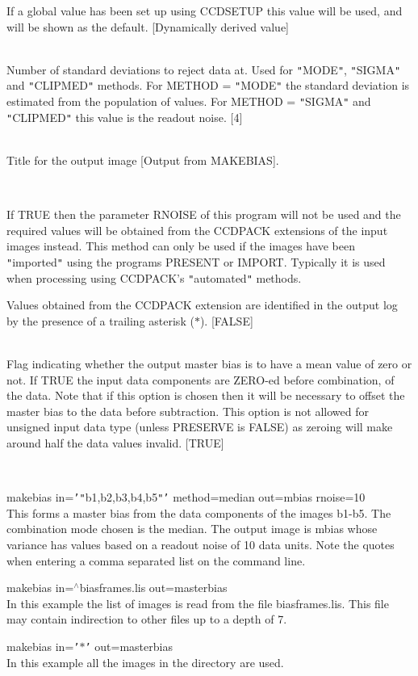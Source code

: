 \documentclass[twoside,11pt]{article}
\newcommand{\htmlref}[2]{#1}
\renewcommand{\_}{\texttt{\symbol{95}}}
\newcommand{\qt}[1]{{\tt "}#1{\tt "}}
\newcommand{\qs}[1]{{\tt '}#1{\tt '}}
\newcommand{\xroutine}[1]{\htmlref{{\sc #1}}{#1}}
\newcommand{\sstexamples}[1]{
   \item[Examples:] \mbox{} \\
   \vspace{-3.5ex}
   \begin{description}
      #1
   \end{description}
}
\newcommand{\sstsubsection}[1]{ \item[{#1}] \mbox{} \\}
\newcommand{\sstexamplesubsection}[2]{\sloppy \item{\ssttt #1} \mbox{} \\ #2 }
\newcommand{\sstnotes}[1]{\item[Notes:] \mbox{} \\[1.3ex] #1}
\newcommand{\sstitemlist}[1]{
  \mbox{} \\
  \vspace{-3.5ex}
  \begin{itemize}
     #1
  \end{itemize}
}
\newcommand{\sstexamples}[1]{
      \item[Examples:] \\
      \begin{description}
         #1
      \end{description}
      \\
   }
\newcommand{\sstsubsection}[1]{\item[{#1}]}
\newcommand{\sstexamplesubsection}[2]{\item[{\ssttt #1}] #2}
\newcommand{\sstnotes}[1]{\item[Notes:] #1 }
\newcommand{\sstitemlist}[1]{
      \begin{itemize}
         #1
      \end{itemize}
      \\
   }
\begin{document}
{{{         If a global value has been set up using \xroutine{CCDSETUP} this value
         will be used, and will be shown as the default.
         [Dynamically derived value]
      }
      \sstsubsection{
         SIGMAS = \_REAL (Read)
      } {
         Number of standard deviations to reject data at. Used for
         \qt{MODE}, \qt{SIGMA} and \qt{CLIPMED} methods. For METHOD =
         \qt{MODE} the standard deviation is estimated from the
         population of values. For METHOD = \qt{SIGMA} and
         \qt{CLIPMED} this value is the readout noise.
         [4]
      }
      \sstsubsection{
         TITLE = LITERAL (Read)
      } {
         Title for the output image
         [Output from MAKEBIAS].
      }
      \sstsubsection{
         USEEXT = \_LOGICAL (Read)
      } {
         If TRUE then the parameter RNOISE of this program will not
         be used and the required values will be obtained from the
         CCDPACK extensions of the input images instead. This method can
         only be used if the images have been \qt{imported} using the
         programs \xroutine{PRESENT} or \xroutine{IMPORT}. Typically it is used when
         processing using CCDPACK's \qt{automated} methods.

         Values obtained from the CCDPACK extension are identified in
         the output log by the presence of a trailing asterisk ($*$).
         [FALSE]
      }
      \sstsubsection{
         ZERO = \_LOGICAL (Read)
      } {
         Flag indicating whether the output master bias is to have a
         mean value of zero or not. If TRUE the input data components
         are ZERO-ed before combination, of the data. Note that if
         this option is chosen then it will be necessary to offset the
         master bias to the data before subtraction. This option is
         not allowed for unsigned input data type (unless PRESERVE is
         FALSE) as zeroing will make around half the data values
         invalid.
         [TRUE]
      }
   }
   \sstexamples{
      \sstexamplesubsection{
         makebias in=\qs{\qt{b1,b2,b3,b4,b5}} method=median out=mbias rnoise=10
      } {
         This forms a master bias from the data components of the images
         b1-b5. The combination mode chosen is the median. The output
         image is mbias whose variance has values based on a readout
         noise of 10 data units. Note the quotes when entering a comma
         separated list on the command line.
      }
      \sstexamplesubsection{
         makebias in=$^\wedge$bias\_frames.lis out=master\_bias
      } {
         In this example the list of images is read from the file
         bias\_frames.lis. This file may contain indirection to other files
         up to a depth of 7.
      }
      \sstexamplesubsection{
         makebias in=\qs{$*$} out=master\_bias
      } {
         In this example all the images in the directory are used.
      }
   }
   \sstnotes{
      \sstitemlist{

}}}
\end{document}
